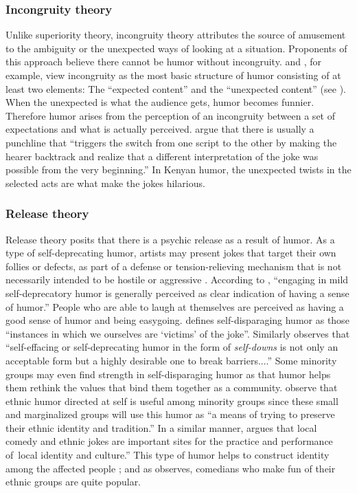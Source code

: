 \documentclass[output=paper]{langsci/langscibook}
\begin{document}
\subsubsection{Incongruity theory}

Unlike superiority theory, incongruity theory attributes the source of amusement to the ambiguity or the unexpected ways of looking at a situation. Proponents of this approach believe there cannot be humor without incongruity. \citet{Berk1999} and \citet{Carroll2014}, for example, view incongruity as the most basic structure of humor consisting of at least two elements: The “expected content” and the “unexpected content” (see \citealt[7]{Berk1999}). When the unexpected is what the audience gets, humor becomes funnier. Therefore humor arises from the perception of an incongruity between a set of expectations and what is actually perceived.  \citet[308]{AttardoRaskin1991} argue that there is usually a punchline that “triggers the switch from one script to the other by making the hearer backtrack and realize that a different interpretation of the joke was possible from the very beginning.” In Kenyan humor, the unexpected twists in the selected acts are what make the jokes hilarious. 

\subsubsection{Release theory}

Release theory posits that there is a psychic release as a result of humor. As a type of self-deprecating humor, artists may present jokes that target their own follies or defects, as part of a defense or tension-relieving mechanism that is not necessarily intended to be hostile or aggressive \citep{Davies1990,Gulas2006}. According to \citet[30]{Apte1987}, “engaging in mild self-deprecatory humor is generally perceived as clear indication of having a sense of humor.” People who are able to laugh at themselves are perceived as having a good sense of humor and being easygoing. \citet[x]{Ziv1988} defines self-disparaging humor as those “instances in which we ourselves are ‘victims’ of the joke”. Similarly \citet[12]{Berk1999} observes that “self-effacing or self-deprecating humor in the form of \textit{self-downs} is not only an acceptable form but a highly desirable one to break barriers....” Some minority groups may even find strength in self-disparaging humor as that humor helps them rethink the values that bind them together as a community. \citet[172]{GonzalesWiseman2005} observe that ethnic humor directed at self is useful among minority groups since these small and marginalized groups will use this humor as “a means of trying to preserve their ethnic identity and tradition.” In a similar manner, \citet[298]{Labrador2004} argues that {local comedy and ethnic jokes are important sites for the practice and performance of~local identity and culture.” }This type of humor helps to construct identity among the affected people \citep{Labrador2004,Rappoport2005}; and as \citet[36]{Apte1987} observes, comedians who make fun of their ethnic groups are quite popular. 
\end{document}
